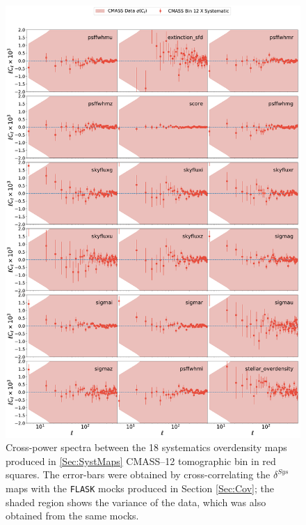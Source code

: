 \begin{figure}
\begin{center}
\includegraphics[width=\textwidth]{BOSS-FIGS/systematics_CMASS_Bin6_LOWZ_Bin6.pdf}
\caption[Cross-power spectra between systematics and CMASS--12 tomographic bins. ]{Cross-power spectra between the 18 systematics overdensity maps produced in \ref{Sec:SystMaps} CMASS--12 tomographic bin in red squares. The error-bars were obtained by cross-correlating the $\delta^{Sys}$ maps with the \texttt{FLASK} mocks produced in Section \ref{Sec:Cov}; the shaded region shows the variance of the data, which was also obtained from the same mocks.}
\label{fig:SystBin6}
\end{center}
\end{figure}





